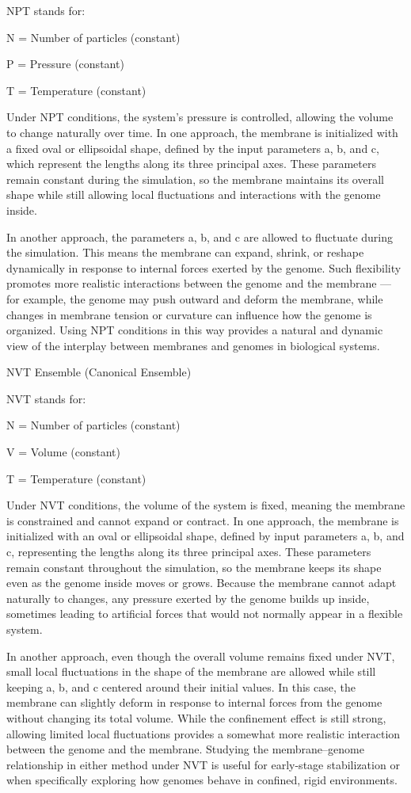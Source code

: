 \documentclass[12pt]{article}
\begin{document}
\begin{flushleft}
NPT stands for:

    N = Number of particles (constant)

    P = Pressure (constant)

    T = Temperature (constant)
    
    Under NPT conditions, the system’s pressure is controlled, allowing the volume to change naturally over time. In one approach, the membrane is initialized with a fixed oval or ellipsoidal shape, defined by the input parameters a, b, and c, which represent the lengths along its three principal axes. These parameters remain constant during the simulation, so the membrane maintains its overall shape while still allowing local fluctuations and interactions with the genome inside.

In another approach, the parameters a, b, and c are allowed to fluctuate during the simulation. This means the membrane can expand, shrink, or reshape dynamically in response to internal forces exerted by the genome. Such flexibility promotes more realistic interactions between the genome and the membrane — for example, the genome may push outward and deform the membrane, while changes in membrane tension or curvature can influence how the genome is organized. Using NPT conditions in this way provides a natural and dynamic view of the interplay between membranes and genomes in biological systems.

\noindent NVT Ensemble (Canonical Ensemble)

NVT stands for:

    N = Number of particles (constant)

    V = Volume (constant)

    T = Temperature (constant)

Under NVT conditions, the volume of the system is fixed, meaning the membrane is constrained and cannot expand or contract. In one approach, the membrane is initialized with an oval or ellipsoidal shape, defined by input parameters a, b, and c, representing the lengths along its three principal axes. These parameters remain constant throughout the simulation, so the membrane keeps its shape even as the genome inside moves or grows. Because the membrane cannot adapt naturally to changes, any pressure exerted by the genome builds up inside, sometimes leading to artificial forces that would not normally appear in a flexible system.

In another approach, even though the overall volume remains fixed under NVT, small local fluctuations in the shape of the membrane are allowed while still keeping a, b, and c centered around their initial values. In this case, the membrane can slightly deform in response to internal forces from the genome without changing its total volume. While the confinement effect is still strong, allowing limited local fluctuations provides a somewhat more realistic interaction between the genome and the membrane. Studying the membrane–genome relationship in either method under NVT is useful for early-stage stabilization or when specifically exploring how genomes behave in confined, rigid environments.


\end{flushleft}
\end{document}
